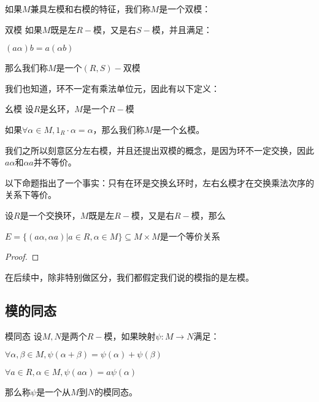 \documentclass[12pt, a4paper, oneside, UTF8]{ctexbook}
\begin{document}
			如果$M$兼具左模和右模的特征，我们称$M$是一个双模：
			\begin{defn}{双模}{}
				如果$M$既是左$R-$模，又是右$S-$模，并且满足：

				$(a \alpha )b=a(\alpha b)$

				那么我们称$M$是一个$(R,S)-$双模
			\end{defn}
			我们也知道，环不一定有乘法单位元，因此有以下定义：
			\begin{defn}{幺模}{}
				设$R$是幺环，$M$是一个$R-$模

				如果$\forall \alpha \in M,1_R \cdot \alpha =\alpha $，那么我们称$M$是一个幺模。
			\end{defn}
			我们之所以刻意区分左右模，并且还提出双模的概念，是因为环不一定交换，因此$a\alpha $和$\alpha a$并不等价。

			以下命题指出了一个事实：只有在环是交换幺环时，左右幺模才在交换乘法次序的关系下等价。
			\begin{proposition}
				设$R$是一个交换环，$M$既是左$R-$模，又是右$R-$模，那么

				$E = \{(a\alpha ,\alpha a)| a \in R,\alpha \in M\} \subseteq M \times M$是一个等价关系
			\end{proposition}
			\begin{proof}
				
			\end{proof}
			在后续中，除非特别做区分，我们都假定我们说的模指的是左模。
		\subsection{模的同态}
			\begin{defn}{模同态}{}
				设$M,N$是两个$R-$模，如果映射$\psi  : M \rightarrow N$满足：

				$\forall \alpha ,\beta  \in M,\psi (\alpha +\beta )=\psi (\alpha )+\psi (\beta )$

				$\forall a \in R,\alpha  \in M,\psi (a\alpha )=a\psi (\alpha )$

				那么称$\psi $是一个从$M$到$N$的模同态。
			\end{defn}
\ifx\allfiles\undefined
\end{document}
